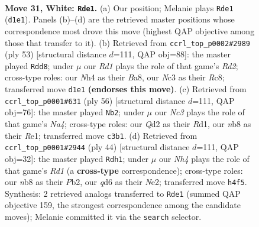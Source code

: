 \documentclass[11pt]{article}
\begin{document}
\begin{figure}[p]
\label{fig:thought-m58}
\end{figure}

\clearpage

\begin{figure}[p]\centering
\begin{subfigure}{0.46\textwidth}\centering
\resizebox{\linewidth}{!}{%
\newchessgame
\chessboard[
  setfen={1nb4r/rp4k1/2pqp3/p2p1p1p/Pn1P1P1N/2N3P1/1PPQB1KP/3R3R w - - 15 31},
  showmover=false,
  pgfstyle=straightmove, color=movearrow, markmove={d1-e1}
]}
\caption{}
\end{subfigure}\hfill
\begin{subfigure}{0.46\textwidth}\centering
\resizebox{\linewidth}{!}{%
\newchessgame
\chessboard[
  setfen={b1r3k1/p2rqpp1/1p1ppn1p/4n3/1PPNP3/P3Q2P/3N1PP1/3RRBK1 b - - 6 27},
  showmover=false,
  pgfstyle=straightmove, color=movearrow, markmove={d7-d8}
]}
\caption{}
\end{subfigure}
\\[4pt]
\begin{subfigure}{0.46\textwidth}\centering
\resizebox{\linewidth}{!}{%
\newchessgame
\chessboard[
  setfen={1r2r3/2qn1pbk/3p2pp/p1pPp2n/NpP1P3/1P3NPP/P1QB1PK1/3RR3 w - e6 0 29},
  showmover=false,
  pgfstyle=straightmove, color=movearrow, markmove={a4-b2}
]}
\caption{}
\end{subfigure}\hfill
\begin{subfigure}{0.46\textwidth}\centering
\resizebox{\linewidth}{!}{%
\newchessgame
\chessboard[
  setfen={r1bq2k1/1p1n1r1p/p2p2n1/2pPp3/B1P1PpP1/P1N2P1R/1P1QN3/2KR4 w - - 2 23},
  showmover=false,
  pgfstyle=straightmove, color=movearrow, markmove={d1-h1}
]}
\caption{}
\end{subfigure}
\caption{\textbf{Move 31, White: \texttt{Rde1}.} (a) Our position; Melanie plays \texttt{Rde1} (\texttt{d1e1}). Panels (b)--(d) are the retrieved master positions whose correspondence most drove this move (highest QAP objective among those that transfer to it). (b) Retrieved from \texttt{ccrl\_top\_p0002\#2989} (ply 53) [structural distance $d$=111, QAP obj=88]: the master played \texttt{Rdd8}; under $\mu$ our \emph{Rd1} plays the role of that game's \emph{Rd2}; cross-type roles: our \emph{N}h4 as their \emph{B}a8, our \emph{N}c3 as their \emph{R}c8; transferred move \texttt{d1e1} \textbf{(endorses this move)}. (c) Retrieved from \texttt{ccrl\_top\_p0001\#631} (ply 56) [structural distance $d$=111, QAP obj=76]: the master played \texttt{Nb2}; under $\mu$ our \emph{Nc3} plays the role of that game's \emph{Na4}; cross-type roles: our \emph{Q}d2 as their \emph{R}d1, our \emph{n}b8 as their \emph{R}e1; transferred move \texttt{c3b1}. (d) Retrieved from \texttt{ccrl\_top\_p0001\#2944} (ply 44) [structural distance $d$=111, QAP obj=32]: the master played \texttt{Rdh1}; under $\mu$ our \emph{Nh4} plays the role of that game's \emph{Rd1} (a \textbf{cross-type} correspondence); cross-type roles: our \emph{n}b8 as their \emph{P}b2, our \emph{q}d6 as their \emph{N}e2; transferred move \texttt{h4f5}. Synthesis: 2 retrieved analogs transferred to \texttt{Rde1} (summed QAP objective 159, the strongest correspondence among the candidate moves); Melanie committed it via the \texttt{search} selector.}

\end{figure}
\end{document}
